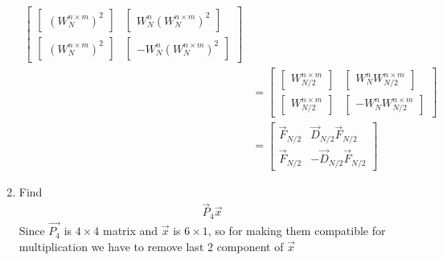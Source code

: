 \documentclass[journal,12pt,twocolumn]{IEEEtran}
\renewcommand\thesection{\arabic{section}}
\begin{document}
\begin{enumerate}[label=\arabic*.,ref=\thesection.\theenumi]
\begin{align}
\begin{bmatrix}
	\begin{bmatrix}
		\left(W_N^{n\times m}\right)^2
	\end{bmatrix}&
\begin{bmatrix}
	W_N^n\left(W_N^{n\times m}\right)^2
\end{bmatrix}\\
	\begin{bmatrix}
		\left(W_N^{n\times m}\right)^2
	\end{bmatrix}&
\begin{bmatrix}
	-W_N^n\left(W_N^{n\times m}\right)^2
\end{bmatrix}
\end{bmatrix}\\
&=\begin{bmatrix}
	\begin{bmatrix}
		W_{N/2}^{n\times m}
	\end{bmatrix}&
\begin{bmatrix}
	W_{N}^nW_{N/2}^{n\times m}
\end{bmatrix}\\
	\begin{bmatrix}
		W_{N/2}^{n\times m}
	\end{bmatrix}&
\begin{bmatrix}
	-W_N^nW_{N/2}^{n\times m}
\end{bmatrix}
\end{bmatrix}\\
&=\begin{bmatrix}
	\vec{F}_{N/2}&\vec{D}_{N/2}\vec{F}_{N/2}\\
	\vec{F}_{N/2}&-\vec{D}_{N/2}\vec{F}_{N/2}
\end{bmatrix}
\end{align}
	\item Find 
	\begin{align}
		\vec{P}_4 \vec{x}
	\end{align}
\solution Since $\vec{P_4}$ is $4\times4$ matrix and $\vec{x}$ is $6\times1$, so for making them compatible for multiplication we have to remove last 2 component of $\vec{x}$

\end{enumerate}
\end{document}
